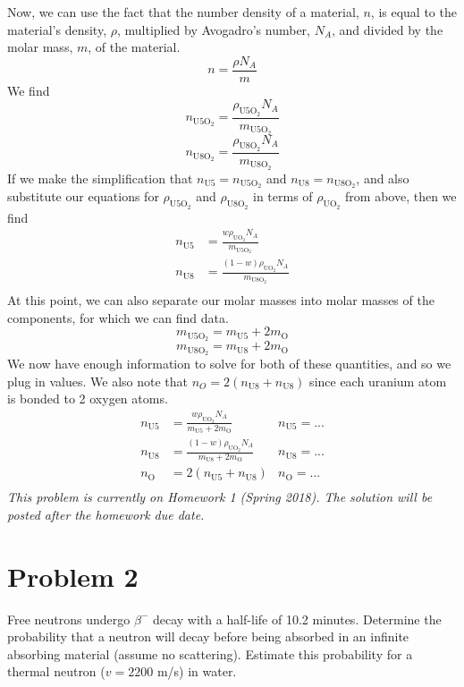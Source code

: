 \documentclass{report}
\begin{document}
Now, we can use the fact that the number density of a material, $n$, is equal to the material's density, $\rho$, multiplied by Avogadro's number, $N_A$, and divided by the molar mass, $m$, of the material. 
$$ n = \frac{\rho N_A}{m} $$
We find
$$ n_{\text{U5O}_2} = \frac{\rho_{\text{U5O}_2} N_A}{m_{\text{U5O}_2}} $$
$$ n_{\text{U8O}_2} = \frac{\rho_{\text{U8O}_2} N_A}{m_{\text{U8O}_2}} $$
If we make the simplification that $n_{\text{U5}} = n_{\text{U5O}_2}$ and $n_{\text{U8}} = n_{\text{U8O}_2}$, and also substitute our equations for $\rho_{\text{U5O}_2}$ and $\rho_{\text{U8O}_2}$ in terms of $\rho_{\text{UO}_2}$ from above, then we find 
\begin{align*}
n_{\text{U5}} &= \frac{w\rho_{\text{UO}_2} N_A}{m_{\text{U5O}_2}} \\
n_{\text{U8}} &= \frac{(1-w)\rho_{\text{UO}_2} N_A}{m_{\text{U8O}_2}} \\
\end{align*}
At this point, we can also separate our molar masses into molar masses of the components, for which we can find data. 
$$ m_{\text{U5O}_2} = m_{\text{U5}} + 2m_{\text{O}} $$
$$ m_{\text{U8O}_2} = m_{\text{U8}} + 2m_{\text{O}} $$
We now have enough information to solve for both of these quantities, and so we plug in values. We also note that $n_O = 2(n_{\text{U8}} + n_{\text{U8}})$ since each uranium atom is bonded to 2 oxygen atoms.
\begin{align*}
n_{\text{U5}}	&= \frac{w\rho_{\text{UO}_2} N_A}{m_{\text{U5}} + 2m_{\text{O}}}		& \boxed{n_{\text{U5}}= ... }\\
n_{\text{U8}}	&= \frac{(1-w)\rho_{\text{UO}_2} N_A}{m_{\text{U8}} + 2m_{\text{O}}} 	& \boxed{n_{\text{U8}}= ... }\\
n_{\text{O}}	&= 2(n_{\text{U5}} + n_{\text{U8}})  									& \boxed{n_{\text{O}}= ...  }\\
\end{align*}
\else
\textit{This problem is currently on Homework 1 (Spring 2018). The solution will be posted after the homework due date.}
\fi



\newpage
\section*{Problem 2}

Free neutrons undergo $\beta^{-}$ decay with a half-life of 10.2 minutes. Determine the probability that a neutron will decay before being absorbed in an infinite absorbing material (assume no scattering). Estimate this probability for a thermal neutron ($v = 2200$ m/s) in water.
\end{document}

